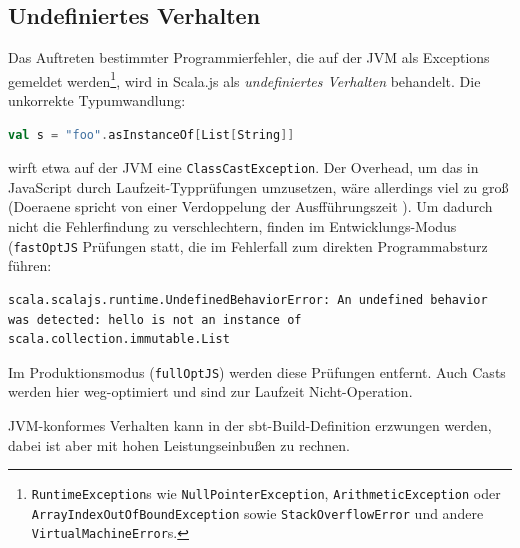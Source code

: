 \documentclass[a4paper, 12pt, hidelinks, listof=totoc, listoftables=totoc, bibliography=totoc]{scrreprt}
\newcommand{\code}[1]{\lstinline[language=Scala, style=inline]|#1|}
\newcommand{\scala}[1]{\lstinline[language=Scala, style=inline]|#1|}
\begin{document}
\subsection{Undefiniertes Verhalten}\label{subsec:undefined-behavior}

Das Auftreten bestimmter Programmierfehler, die auf der JVM als Exceptions gemeldet werden\footnote{\scala{RuntimeException}s wie \scala{NullPointerException}, \scala{ArithmeticException} oder \scala{ArrayIndexOutOfBoundException} sowie \scala{StackOverflowError} und andere \scala{VirtualMachineError}s.},
wird in Scala.js als \textit{undefiniertes Verhalten} behandelt. Die unkorrekte Typumwandlung:

\begin{lstlisting}[language=Scala, style=snippet]
val s = "foo".asInstanceOf[List[String]]
\end{lstlisting}

wirft etwa auf der JVM eine \scala{ClassCastException}. Der Overhead, um das in JavaScript durch Laufzeit-Typprüfungen umzusetzen, wäre allerdings viel zu groß (Doeraene spricht von einer Verdoppelung der Ausfführungszeit \cite[Folie 23 ff., Min. 15]{doeraene2015.SSP}). Um dadurch nicht die Fehlerfindung zu verschlechtern, finden im Entwicklungs-Modus (\code{fastOptJS} Prüfungen statt, die im Fehlerfall zum direkten Programmabsturz führen:

\begin{lstlisting}[style=snippet]
scala.scalajs.runtime.UndefinedBehaviorError: An undefined behavior was detected: hello is not an instance of scala.collection.immutable.List
\end{lstlisting}

Im Produktionsmodus (\code{fullOptJS}) werden diese Prüfungen entfernt. Auch Casts werden hier weg-optimiert und sind zur Laufzeit Nicht-Operation.

JVM-konformes Verhalten kann in der sbt-Build-Definition erzwungen werden, dabei ist aber mit hohen Leistungseinbußen zu rechnen.\cite[Folie 23 ff., Min. 15]{doeraene2015.SSP}\cite{scalajs.DSS}
\end{document}
